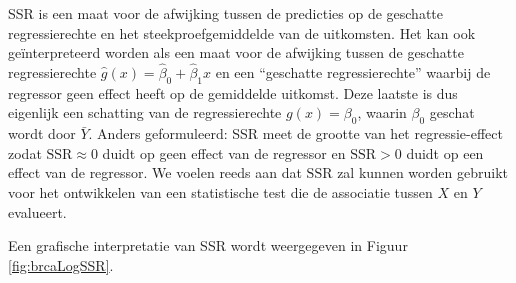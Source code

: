 \documentclass[12pt,dutch,coursenotes]{book}
\newenvironment{Shaded}{\begin{snugshade}}{\end{snugshade}}
\newcommand{\KeywordTok}[1]{\textcolor[rgb]{0.13,0.29,0.53}{\textbf{#1}}}
\newcommand{\DataTypeTok}[1]{\textcolor[rgb]{0.13,0.29,0.53}{#1}}
\newcommand{\DecValTok}[1]{\textcolor[rgb]{0.00,0.00,0.81}{#1}}
\newcommand{\FloatTok}[1]{\textcolor[rgb]{0.00,0.00,0.81}{#1}}
\newcommand{\StringTok}[1]{\textcolor[rgb]{0.31,0.60,0.02}{#1}}
\newcommand{\ControlFlowTok}[1]{\textcolor[rgb]{0.13,0.29,0.53}{\textbf{#1}}}
\newcommand{\OperatorTok}[1]{\textcolor[rgb]{0.81,0.36,0.00}{\textbf{#1}}}
\newcommand{\NormalTok}[1]{#1}
\theoremstyle{definition}
\theoremstyle{definition}
\theoremstyle{definition}
\theoremstyle{remark}
\begin{document}
SSR is een maat voor de afwijking tussen de predicties op de geschatte
regressierechte en het steekproefgemiddelde van de uitkomsten. Het kan
ook geïnterpreteerd worden als een maat voor de afwijking tussen de
geschatte regressierechte \(\hat{g}(x)=\hat\beta_0+\hat\beta_1x\) en een
``geschatte regressierechte'' waarbij de regressor geen effect heeft op
de gemiddelde uitkomst. Deze laatste is dus eigenlijk een schatting van
de regressierechte \(g(x)=\beta_0\), waarin \(\beta_0\) geschat wordt
door \(\bar{Y}\). Anders geformuleerd: SSR meet de grootte van het
regressie-effect zodat \(\text{SSR} \approx 0\) duidt op geen effect van
de regressor en \(\text{SSR}>0\) duidt op een effect van de regressor.
We voelen reeds aan dat \(\text{SSR}\) zal kunnen worden gebruikt voor
het ontwikkelen van een statistische test die de associatie tussen \(X\)
en \(Y\) evalueert.

Een grafische interpretatie van SSR wordt weergegeven in Figuur
\ref{fig:brcaLogSSR}.

\begin{Shaded}
\end{Shaded}
\end{document}
